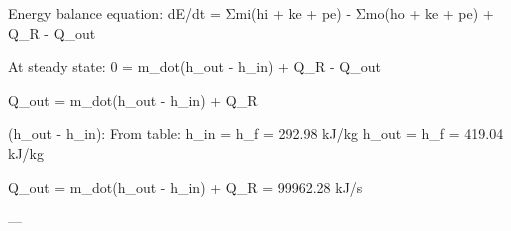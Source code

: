 Energy balance equation:  
dE/dt = Σmi(hi + ke + pe) - Σmo(ho + ke + pe) + Q_R - Q_out  

At steady state:  
0 = m_dot(h_out - h_in) + Q_R - Q_out  

Q_out = m_dot(h_out - h_in) + Q_R  

(h_out - h_in): From table:  
h_in = h_f = 292.98 kJ/kg  
h_out = h_f = 419.04 kJ/kg  

Q_out = m_dot(h_out - h_in) + Q_R = 99962.28 kJ/s  

---